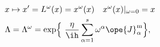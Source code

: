 \begin{equation}	\label{4.1}
	\begin{split}
& x\mapsto x' = L^\omega(x) = x^\omega(x) \quad x^\omega(x)|_{\omega=0} = x
\\
& \Lambda
 = \Lambda^\omega
 = \exp\Bigl\{ \
   \frac{\eta}{\ih} \sum_{\alpha=1}^{s} \omega^\alpha
					\ope{J}_\alpha^{\mathrm{m}}
   \Bigr\} ,
	\end{split}
	\end{equation}

